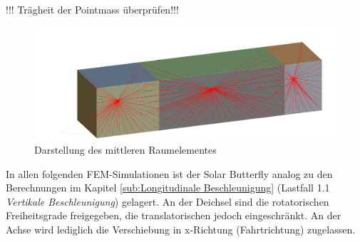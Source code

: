 !!! Trägheit der Pointmass überprüfen!!!

\begin{figure}[h]
  \includegraphics[width=0.5\linewidth]{04_Figures/FEM Punktmasse.png}
  \caption{Darstellung des mittleren Raumelementes}
  \label{img:FEM Punktmasse}
\end{figure}

In allen folgenden FEM-Simulationen ist der Solar Butterfly analog zu den Berechnungen im Kapitel \ref{sub:Longitudinale Beschleunigung} (Lastfall 1.1 \emph{Vertikale Beschleunigung}) gelagert. An der Deichsel sind die rotatorischen Freiheitsgrade freigegeben, die translatorischen jedoch eingeschränkt. An der Achse wird lediglich die Verschiebung in x-Richtung (Fahrtrichtung) zugelassen.





